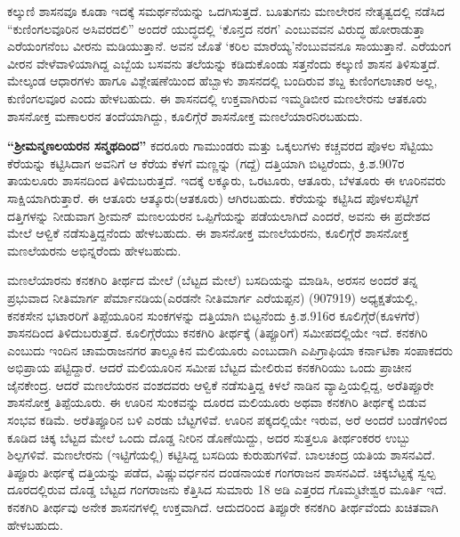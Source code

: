 ಕಲ್ಕುಣಿ ಶಾಸನವೂ ಕೂಡಾ ಇದಕ್ಕೆ ಸಮರ್ಥನೆಯನ್ನು ಒದಗಿಸುತ್ತದೆ. ಬೂತುಗನು ಮಣಲೇರನ ನೇತೃತ್ವದಲ್ಲಿ ನಡೆಸಿದ “ಕುಣಿಂಗಲವೂರಿನ ಅಸಿವರದಲಿ” ಅಂದರೆ ಯುದ್ಧದಲ್ಲಿ ‘ಕೊನ್ತದ ನರಗ’ ಎಂಬುವವನ ವಿರುದ್ಧ ಹೋರಾಡುತ್ತಾ ಎರೆಯಂಗನೆಂಬ ವೀರನು ಮಡಿಯುತ್ತಾನೆ. ಅವನ ಜೊತೆ ‘ಕರಿಲ ಮಾರೆಯ್ಯ’ನೆಂಬುವವನೂ ಸಾಯುತ್ತಾನೆ. ಎರೆಯಂಗ ವೀರನ ವೇಳೆವಾಳಿಯಾಗಿದ್ದ ಎಬ್ಬೆಯ ಬಸವನು ತಲೆಯನ್ನು ಕಡಿದುಕೊಂಡು ಸತ್ತನೆಂದು ಕಲ್ಕುಣಿ ಶಾಸನ ತಿಳಿಸುತ್ತದೆ. ಮೇಲ್ಕಂಡ ಆಧಾರಗಳು ಹಾಗೂ ವಿಶ್ಲೇಷಣೆಯಿಂದ ಹೆಬ್ಬಾಳು ಶಾಸನದಲ್ಲಿ ಬಂದಿರುವ ಶಬ್ದ ಕುಣಿಂಗಲಾಚಾರ ಅಲ್ಲ, ಕುಣಿಂಗಲವೂರ ಎಂದು ಹೇಳಬಹುದು. ಈ ಶಾಸನದಲ್ಲಿ ಉಕ್ತವಾಗಿರುವ ಇಮ್ಮಡಿಬೀರ ಮಣಲೇರನು ಆತಕೂರು ಶಾಸನೋಕ್ತ ಮಣಾಲರನ ತಂದೆಯಾಗಿದ್ದು, ಕೂಲಿಗ್ಗೆರೆ ಶಾಸನೋಕ್ತ ಮಣಲೆಯಾರನಿರಬಹುದು.

\textbf{“ಶ‍್ರೀಮನ್ಮಣಲಯರನ ಸನ್ಮಥದಿಂದ”} ಕದರೂರು ಗಾಮುಂಡರು ಮತ್ತು ಒಕ್ಕಲುಗಳು ಕಚ್ಚವರದ ಪೊಳಲ ಸೆಟ್ಟಿಯು ಕೆರೆಯನ್ನು ಕಟ್ಟಿಸಿದಾಗ ಅವನಿಗೆ ಆ ಕೆರೆಯ ಕೆಳಗೆ ಮಣ್ಣನ್ನು (ಗದ್ದೆ) ದತ್ತಿಯಾಗಿ ಬಿಟ್ಟರೆಂದು, ಕ್ರಿ.ಶ.907ರ ತಾಯಲೂರು ಶಾಸನದಿಂದ ತಿಳಿದುಬರುತ್ತದೆ. ಇದಕ್ಕೆ ಲಕ್ಕೂರು, ಒರಟೂರು, ಆತೂರು, ಬೆಳತೂರು ಈ ಊರಿನವರು ಸಾಕ್ಷಿಯಾಗಿರುತ್ತಾರೆ. ಈ ಆತೂರು ಆತ್ಕೂರು(ಆತಕೂರು) ಆಗಿರಬಹುದು. ಕೆರೆಯನ್ನು ಕಟ್ಟಿಸಿದ ಪೊಳಲಸೆಟ್ಟಿಗೆ ದತ್ತಿಗಳನ್ನು ನೀಡುವಾಗ ಶ‍್ರೀಮನ್​ ಮಣಲಯರನ ಒಪ್ಪಿಗೆಯನ್ನು ಪಡೆಯಲಾಗಿದೆ ಎಂದರೆ, ಅವನು ಈ ಪ್ರದೇಶದ ಮೇಲೆ ಆಳ್ವಿಕೆ ನಡೆಸುತ್ತಿದ್ದನೆಂದು ಹೇಳಬಹುದು. ಈ ಶಾಸನೋಕ್ತ ಮಣಲೆಯರನು, ಕೂಲಿಗ್ಗೆರೆ ಶಾಸನೋಕ್ತ ಮಣಲೆಯರನು ಅಭಿನ್ನರೆಂದು ಹೇಳಬಹುದು.

ಮಣಲೆಯಾರನು ಕನಕಗಿರಿ ತೀರ್ಥದ ಮೇಲೆ (ಬೆಟ್ಟದ ಮೇಲೆ) ಬಸದಿಯನ್ನು ಮಾಡಿಸಿ, ಅರಸನ ಅಂದರೆ ತನ್ನ ಪ್ರಭುವಾದ ನೀತಿಮಾರ್ಗ ಪೆರ್ಮಾನಡಿಯ(ಎರಡನೇ ನೀತಿಮಾರ್ಗ ಎರೆಯಪ್ಪನ) (907\enginline{-}919) ಅಧ್ಯಕ್ಷತೆಯಲ್ಲಿ, ಕನಕಸೇನ ಭಟಾರರಿಗೆ ತಿಪ್ಪೆಯೂರಿನ ಸುಂಕಗಳನ್ನು ದತ್ತಿಯಾಗಿ ಬಿಟ್ಟನೆಂದು ಕ್ರಿ.ಶ.916ರ ಕೂಲಿಗ್ಗೆರೆ(ಕೂಳಗೆರೆ) ಶಾಸನದಿಂದ ತಿಳಿದುಬರುತ್ತದೆ. ಕೂಲಿಗ್ಗೆರೆಯು ಕನಕಗಿರಿ ತೀರ್ಥಕ್ಕೆ (ತಿಪ್ಪೂರಿಗೆ) ಸಮೀಪದಲ್ಲಿಯೇ ಇದೆ. ಕನಕಗಿರಿ ಎಂಬುದು ಇಂದಿನ ಚಾಮರಾಜನಗರ ತಾಲ್ಲೂಕಿನ ಮಲಿಯೂರು ಎಂಬುದಾಗಿ ಎಪಿಗ್ರಾಫಿಯಾ ಕರ್ನಾಟಿಕಾ ಸಂಪಾಕದರು ಅಭಿಪ್ರಾಯ ಪಟ್ಟಿದ್ದಾರೆ. ಆದರೆ ಮಲಿಯೂರಿನ ಸಮೀಪ ಬೆಟ್ಟದ ಮೇಲಿರುವ ಕನಕಗಿರಿಯು ಒಂದು ಪ್ರಾಚೀನ ಜೈನಕೇಂದ್ರ. ಆದರೆ ಮಣಲೆಯರನ ವಂಶದವರು ಆಳ್ವಿಕೆ ನಡೆಸುತ್ತಿದ್ದ ಕಿಳಲೆ ನಾಡಿನ ವ್ಯಾಪ್ತಿಯಲ್ಲಿದ್ದ, ಅರೆತಿಪ್ಪೂರೇ ಶಾಸನೋಕ್ತ ತಿಪ್ಪೆಯೂರು. ಈ ಊರಿನ ಸುಂಕವನ್ನು ದೂರದ ಮಲಿಯೂರು ಅಥವಾ ಕನಕಗಿರಿ ತೀರ್ಥಕ್ಕೆ ಬಿಡುವ ಸಂಭವ ಕಡಿಮೆ. ಅರೆತಿಪ್ಪೂರಿನ ಬಳಿ ಎರಡು ಬೆಟ್ಟಗಳಿವೆ. ಊರಿನ ಪಕ್ಕದಲ್ಲಿಯೇ ಇರುವ, ಅರೆ ಅಂದರೆ ಬಂಡೆಗಳಿಂದ ಕೂಡಿದ ಚಿಕ್ಕ ಬೆಟ್ಟದ ಮೇಲೆ ಒಂದು ದೊಡ್ಡ ನೀರಿನ ಡೊಣೆಯಿದ್ದು, ಅದರ ಸುತ್ತಲೂ ತೀರ್ಥಂಕರರ ಉಬ್ಬು ಶಿಲ್ಪಗಳಿವೆ. ಮಣಲೇರನು (ಇಟ್ಟಿಗೆಯಲ್ಲಿ) ಕಟ್ಟಿಸಿದ್ದ ಬಸದಿಯ ಕುರುಹುಗಳಿವೆ. ಬಾಲಚಂದ್ರ ಯತಿಯ ಶಾಸನವಿದೆ. ತಿಪ್ಪೂರು ತೀರ್ಥಕ್ಕೆ ದತ್ತಿಯನ್ನು ಪಡೆದ, ವಿಷ್ಣುವರ್ಧನನ ದಂಡನಾಯಕ ಗಂಗರಾಜನ ಶಾಸನವಿದೆ. ಚಿಕ್ಕಬೆಟ್ಟಕ್ಕೆ ಸ್ವಲ್ಪ ದೂರದಲ್ಲಿರುವ ದೊಡ್ಡ ಬೆಟ್ಟದ ಗಂಗರಾಜನು ಕೆತ್ತಿಸಿದ ಸುಮಾರು 18 ಅಡಿ ಎತ್ತರದ ಗೊಮ್ಮಟೇಶ್ವರ ಮೂರ್ತಿ ಇದೆ. ಕನಕಗಿರಿ ತೀರ್ಥವು ಅನೇಕ ಶಾಸನಗಳಲ್ಲಿ ಉಕ್ತವಾಗಿದೆ. ಆದುದರಿಂದ ತಿಪ್ಪೂರೇ ಕನಕಗಿರಿ ತೀರ್ಥವೆಂದು ಖಚಿತವಾಗಿ ಹೇಳಬಹುದು.

